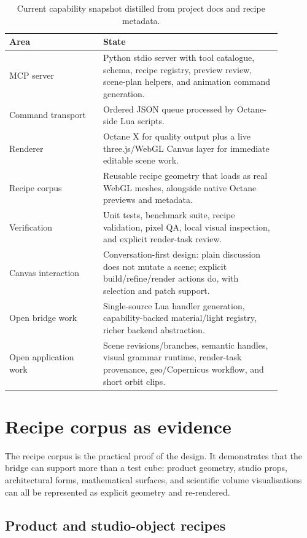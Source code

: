 \documentclass[11pt,a4paper]{article}
\begin{document}
\begin{table}[htbp]
\centering
\caption{Current capability snapshot distilled from project docs and recipe metadata.}
\begin{tabular}{p{0.30\linewidth}p{0.58\linewidth}}
\toprule
\textbf{Area} & \textbf{State} \\
\midrule
MCP server & Python stdio server with tool catalogue, schema, recipe registry, preview review, scene-plan helpers, and animation command generation. \\
Command transport & Ordered JSON queue processed by Octane-side Lua scripts. \\
Renderer & Octane X for quality output plus a live three.js/WebGL Canvas layer for immediate editable scene work. \\
Recipe corpus & Reusable recipe geometry that loads as real WebGL meshes, alongside native Octane previews and metadata. \\
Verification & Unit tests, benchmark suite, recipe validation, pixel QA, local visual inspection, and explicit render-task review. \\
Canvas interaction & Conversation-first design: plain discussion does not mutate a scene; explicit build/refine/render actions do, with selection and patch support. \\
Open bridge work & Single-source Lua handler generation, capability-backed material/light registry, richer backend abstraction. \\
Open application work & Scene revisions/branches, semantic handles, visual grammar runtime, render-task provenance, geo/Copernicus workflow, and short orbit clips. \\
\bottomrule
\end{tabular}
\end{table}

\section{Recipe corpus as evidence}

The recipe corpus is the practical proof of the design. It demonstrates that the bridge can support more than a test cube: product geometry, studio props, architectural forms, mathematical surfaces, and scientific volume visualisations can all be represented as explicit geometry and re-rendered.

\subsection{Product and studio-object recipes}
\end{document}
